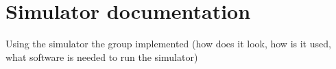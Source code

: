 \chapter{Simulator documentation}
Using the simulator the group implemented (how does it look, how is it used, what software is needed to run the simulator)